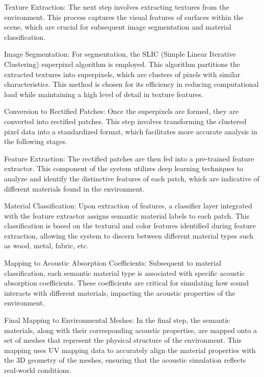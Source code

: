 Texture Extraction: The next step involves extracting textures from the environment. This process captures the visual features of surfaces within the scene, which are crucial for subsequent image segmentation and material classification.

Image Segmentation: For segmentation, the SLIC (Simple Linear Iterative Clustering) superpixel algorithm is employed. This algorithm partitions the extracted textures into superpixels, which are clusters of pixels with similar characteristics. This method is chosen for its efficiency in reducing computational load while maintaining a high level of detail in texture features.

Conversion to Rectified Patches: Once the superpixels are formed, they are converted into rectified patches. This step involves transforming the clustered pixel data into a standardized format, which facilitates more accurate analysis in the following stages.

Feature Extraction: The rectified patches are then fed into a pre-trained feature extractor. This component of the system utilizes deep learning techniques to analyze and identify the distinctive features of each patch, which are indicative of different materials found in the environment.

Material Classification: Upon extraction of features, a classifier layer integrated with the feature extractor assigns semantic material labels to each patch. This classification is based on the textural and color features identified during feature extraction, allowing the system to discern between different material types such as wood, metal, fabric, etc.

Mapping to Acoustic Absorption Coefficients: Subsequent to material classification, each semantic material type is associated with specific acoustic absorption coefficients. These coefficients are critical for simulating how sound interacts with different materials, impacting the acoustic properties of the environment.

Final Mapping to Environmental Meshes: In the final step, the semantic materials, along with their corresponding acoustic properties, are mapped onto a set of meshes that represent the physical structure of the environment. This mapping uses UV mapping data to accurately align the material properties with the 3D geometry of the meshes, ensuring that the acoustic simulation reflects real-world conditions.


